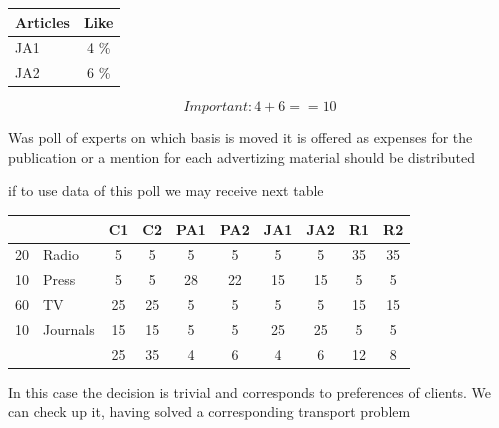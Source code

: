 \documentclass[a4paper,11pt]{scrartcl}
\begin{document}
\begin{tabular}{|l |c|}
\hline
 Articles & Like \\

\hline
JA1  & 4  \%\\
\hline
JA2  & 6  \%\\
\hline

\end {tabular}
\begin{equation} Important:  4+6 == 10 \end{equation}

\bigskip

Was poll of experts on which basis is moved it is offered as expenses for the publication or a mention for each advertizing material should be distributed

if to use  data of this poll we may receive  next   table

\bigskip

\begin{tabular}{|l|l |c| c| c| c| c| c| c| c|}
\hline
&      &  C1 & C2  &  PA1 & PA2 & JA1 & JA2 & R1 & R2\\
\hline
20&Radio &  5 & 5  &  5 & 5 & 5 & 5 & 35 & 35\\
\hline
10&Press &  5 & 5  &  28 & 22 &  15 & 15 & 5 & 5\\
\hline
60&TV &  25 & 25  &  5 & 5 & 5 & 5 & 15 & 15\\
\hline
10&Journals &  15 & 15  &  5 & 5 & 25 & 25 & 5 & 5\\
\hline
 & & 25 &  35 & 4  &  6 & 4 & 6 & 12 & 8 \\
\hline
\end{tabular}


\bigskip


In this case the decision is trivial and corresponds 
to preferences of clients.
We can check up it, having solved a corresponding transport problem


\bigskip
\end{document}
